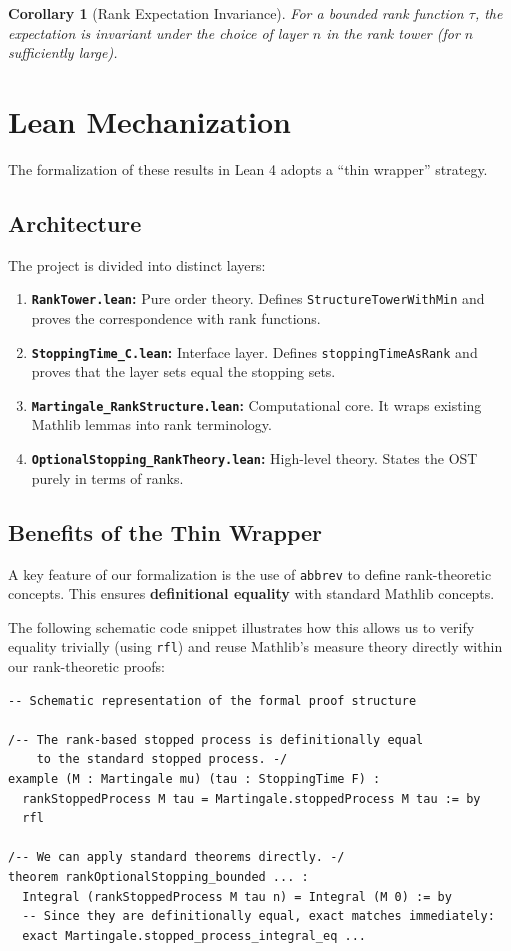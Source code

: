 \documentclass[11pt, a4paper]{article}
\theoremstyle{plain}
\newtheorem{corollary}[theorem]{Corollary}
\theoremstyle{definition}
\theoremstyle{remark}
\begin{document}
\begin{corollary}[Rank Expectation Invariance]
For a bounded rank function $\tau$, the expectation is invariant under the choice of layer $n$ in the rank tower (for $n$ sufficiently large).
\end{corollary}

\section{Lean Mechanization} \label{sec:lean}

The formalization of these results in Lean 4 adopts a ``thin wrapper'' strategy.

\subsection{Architecture}
The project is divided into distinct layers:
\begin{enumerate}
    \item \textbf{\texttt{RankTower.lean}:} Pure order theory. Defines \texttt{StructureTowerWithMin} and proves the correspondence with rank functions.
    \item \textbf{\texttt{StoppingTime\_C.lean}:} Interface layer. Defines \texttt{stoppingTimeAsRank} and proves that the layer sets equal the stopping sets.
    \item \textbf{\texttt{Martingale\_RankStructure.lean}:} Computational core. It wraps existing Mathlib lemmas into rank terminology.
    \item \textbf{\texttt{OptionalStopping\_RankTheory.lean}:} High-level theory. States the OST purely in terms of ranks.
\end{enumerate}

\subsection{Benefits of the Thin Wrapper}
A key feature of our formalization is the use of \texttt{abbrev} to define rank-theoretic concepts. This ensures \textbf{definitional equality} with standard Mathlib concepts.

The following schematic code snippet illustrates how this allows us to verify equality trivially (using \texttt{rfl}) and reuse Mathlib's measure theory directly within our rank-theoretic proofs:

\begin{verbatim}
-- Schematic representation of the formal proof structure

/-- The rank-based stopped process is definitionally equal
    to the standard stopped process. -/
example (M : Martingale mu) (tau : StoppingTime F) :
  rankStoppedProcess M tau = Martingale.stoppedProcess M tau := by
  rfl

/-- We can apply standard theorems directly. -/
theorem rankOptionalStopping_bounded ... :
  Integral (rankStoppedProcess M tau n) = Integral (M 0) := by
  -- Since they are definitionally equal, exact matches immediately:
  exact Martingale.stopped_process_integral_eq ...
\end{verbatim}
\end{document}
